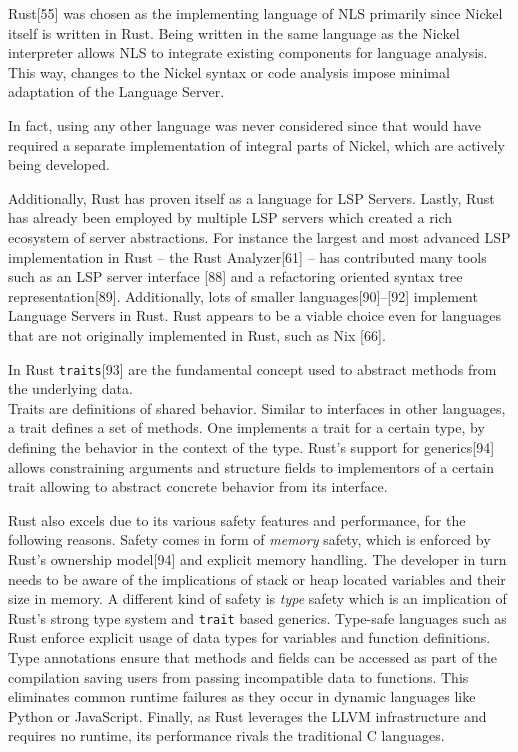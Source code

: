 \documentclass[
  a4paper,
  bibtex,
  english,
  nomenclature]{kthlatex/kththesis/kththesis}
\begin{document}
Rust{[}55{]} was chosen as the implementing language of NLS primarily
since Nickel itself is written in Rust. Being written in the same
language as the Nickel interpreter allows NLS to integrate existing
components for language analysis. This way, changes to the Nickel syntax
or code analysis impose minimal adaptation of the Language Server.

In fact, using any other language was never considered since that would
have required a separate implementation of integral parts of Nickel,
which are actively being developed.

Additionally, Rust has proven itself as a language for LSP Servers.
Lastly, Rust has already been employed by multiple LSP servers which
created a rich ecosystem of server abstractions. For instance the
largest and most advanced LSP implementation in Rust -- the Rust
Analyzer{[}61{]} -- has contributed many tools such as an LSP server
interface {[}88{]} and a refactoring oriented syntax tree
representation{[}89{]}. Additionally, lots of smaller
languages{[}90{]}--{[}92{]} implement Language Servers in Rust. Rust
appears to be a viable choice even for languages that are not originally
implemented in Rust, such as Nix {[}66{]}.

In Rust \texttt{traits}{[}93{]} are the fundamental concept used to
abstract methods from the underlying data.\\
Traits are definitions of shared behavior. Similar to interfaces in
other languages, a trait defines a set of methods. One implements a
trait for a certain type, by defining the behavior in the context of the
type. Rust's support for generics{[}94{]} allows constraining arguments
and structure fields to implementors of a certain trait allowing to
abstract concrete behavior from its interface.

Rust also excels due to its various safety features and performance, for
the following reasons. Safety comes in form of \emph{memory} safety,
which is enforced by Rust's ownership model{[}94{]} and explicit memory
handling. The developer in turn needs to be aware of the implications of
stack or heap located variables and their size in memory. A different
kind of safety is \emph{type} safety which is an implication of Rust's
strong type system and \texttt{trait} based generics. Type-safe
languages such as Rust enforce explicit usage of data types for
variables and function definitions. Type annotations ensure that methods
and fields can be accessed as part of the compilation saving users from
passing incompatible data to functions. This eliminates common runtime
failures as they occur in dynamic languages like Python or JavaScript.
Finally, as Rust leverages the LLVM infrastructure and requires no
runtime, its performance rivals the traditional C languages.
\end{document}
